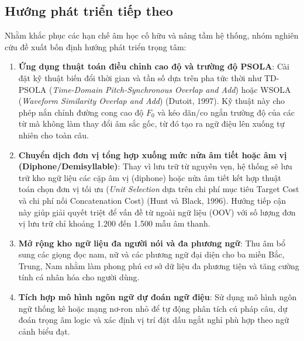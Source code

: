 \subsection{Hướng phát triển tiếp theo}
Nhằm khắc phục các hạn chế âm học cố hữu và nâng tầm hệ thống, nhóm nghiên cứu đề xuất bốn định hướng phát triển trọng tâm:
\begin{enumerate}
    \item \textbf{Ứng dụng thuật toán điều chỉnh cao độ và trường độ PSOLA}: Cài đặt kỹ thuật biến đổi thời gian và tần số dựa trên pha tức thời như TD-PSOLA (\textit{Time-Domain Pitch-Synchronous Overlap and Add}) hoặc WSOLA (\textit{Waveform Similarity Overlap and Add}) (Dutoit, 1997). Kỹ thuật này cho phép nắn chỉnh đường cong cao độ $F_0$ và kéo dãn/co ngắn trường độ của các từ mà không làm thay đổi âm sắc gốc, từ đó tạo ra ngữ điệu lên xuống tự nhiên cho toàn câu.
    \item \textbf{Chuyển dịch đơn vị tổng hợp xuống mức nửa âm tiết hoặc âm vị (Diphone/Demisyllable)}: Thay vì lưu trữ từ nguyên vẹn, hệ thống sẽ lưu trữ kho ngữ liệu các cặp âm vị (diphone) hoặc nửa âm tiết kết hợp thuật toán chọn đơn vị tối ưu (\textit{Unit Selection} dựa trên chi phí mục tiêu Target Cost và chi phí nối Concatenation Cost) (Hunt và Black, 1996). Hướng tiếp cận này giúp giải quyết triệt để vấn đề từ ngoài ngữ liệu (OOV) với số lượng đơn vị lưu trữ chỉ khoảng 1.200 đến 1.500 mẫu âm thanh.
    \item \textbf{Mở rộng kho ngữ liệu đa người nói và đa phương ngữ}: Thu âm bổ sung các giọng đọc nam, nữ và các phương ngữ đại diện cho ba miền Bắc, Trung, Nam nhằm làm phong phú cơ sở dữ liệu đa phương tiện và tăng cường tính cá nhân hóa cho người dùng.
    \item \textbf{Tích hợp mô hình ngôn ngữ dự đoán ngữ điệu}: Sử dụng mô hình ngôn ngữ thống kê hoặc mạng nơ-ron nhỏ để tự động phân tích cú pháp câu, dự đoán trọng âm logic và xác định vị trí đặt dấu ngắt nghỉ phù hợp theo ngữ cảnh biểu đạt.
\end{enumerate}

